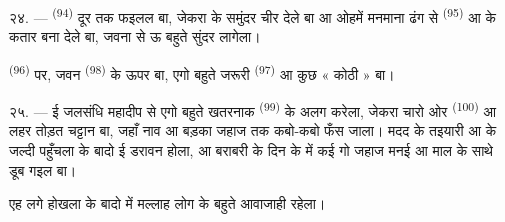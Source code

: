 २४. ---  \textsuperscript{(94)} दूर तक फइलल बा, जेकरा
के समुंदर चीर देले बा आ ओहमें मनमाना ढंग से 
\textsuperscript{(95)} आ  के कतार बना देले बा, जवना से ऊ
बहुते सुंदर लागेला।

 \textsuperscript{(96)} पर, जवन 
\textsuperscript{(98)} के ऊपर बा, एगो बहुते जरूरी 
\textsuperscript{(97)} आ कुछ « कोठी » बा।

२५. --- ई जलसंधि महादीप से एगो बहुते खतरनाक 
\textsuperscript{(99)} के अलग करेला, जेकरा चारो ओर  \textsuperscript{(100)} आ लहर तोड़त चट्टान बा, जहाँ नाव आ बड़का
जहाज तक कबो-कबो फँस जाला। मदद के तइयारी आ  के
जल्दी पहुँचला के बादो ई  डरावन होला, आ बराबरी के
दिन के  में कई गो जहाज मनई आ माल के साथे डूब गइल बा।

एह लगे होखला के बादो  में मल्लाह लोग के बहुते आवाजाही
रहेला।
